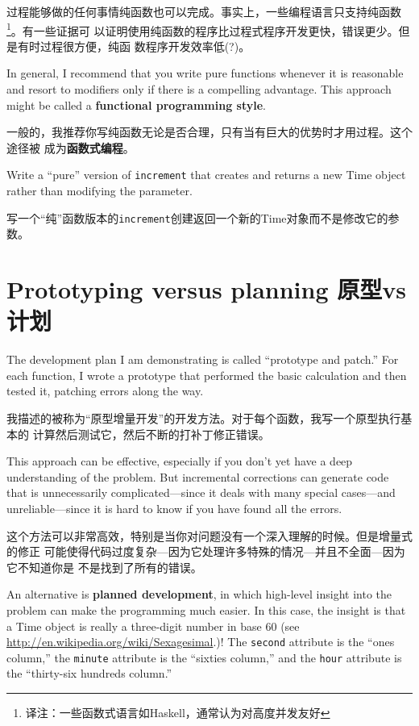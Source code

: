 \documentclass[10pt]{book}
\begin{document}
\begin{CJK}{UTF8}{gbsn}
过程能够做的任何事情纯函数也可以完成。事实上，一些编程语言只支持纯函数
\footnote{译注：一些函数式语言如Haskell，通常认为对高度并发友好}。有一些证据可
以证明使用纯函数的程序比过程式程序开发更快，错误更少。但是有时过程很方便，纯函
数程序开发效率低(?)。

In general, I recommend that you write pure functions whenever it is
reasonable and resort to modifiers only if there is a compelling
advantage.  This approach might be called a {\bf functional
programming style}.

一般的，我推荐你写纯函数无论是否合理，只有当有巨大的优势时才用过程。这个途径被
成为{\bf 函数式编程}。


\begin{exercise}

Write a ``pure'' version of {\tt increment} that creates and returns
a new Time object rather than modifying the parameter.

写一个``纯''函数版本的{\tt increment}创建返回一个新的Time对象而不是修改它的参数。

\end{exercise}


\section{Prototyping versus planning 原型vs 计划}
\label{prototype}

The development plan I am demonstrating is called ``prototype and
patch.''  For each function, I wrote a prototype that performed the
basic calculation and then tested it, patching errors along the
way.

我描述的被称为``原型增量开发''的开发方法。对于每个函数，我写一个原型执行基本的
计算然后测试它，然后不断的打补丁修正错误。

This approach can be effective, especially if you don't yet have a
deep understanding of the problem.  But incremental corrections can
generate code that is unnecessarily complicated---since it deals with
many special cases---and unreliable---since it is hard to know if you
have found all the errors.

这个方法可以非常高效，特别是当你对问题没有一个深入理解的时候。但是增量式的修正
可能使得代码过度复杂---因为它处理许多特殊的情况---并且不全面---因为它不知道你是
不是找到了所有的错误。

An alternative is {\bf planned development}, in which high-level
insight into the problem can make the programming much easier.  In
this case, the insight is that a Time object is really a three-digit
number in base 60 (see \url{http://en.wikipedia.org/wiki/Sexagesimal}.)!  The
{\tt second} attribute is the ``ones column,'' the {\tt minute}
attribute is the ``sixties column,'' and the {\tt hour} attribute is
the ``thirty-six hundreds column.''


\end{CJK}
\end{document}
